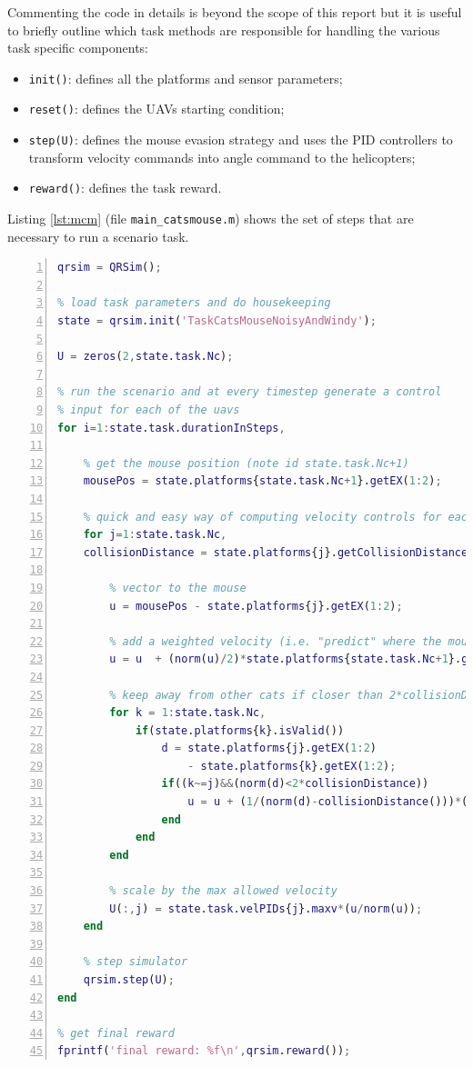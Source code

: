 \documentclass[a4paper,11pt]{report}
\newcommand\mytexttt[1]{\texttt{\hyphenchar\font=45\relax #1}}
\begin{document}
Commenting the code in details is beyond the scope of this report but it is useful to briefly outline which task methods are responsible for handling the various task specific components:
\begin{itemize}
\item\mytexttt{init()}: defines all the platforms and sensor parameters;
\item\mytexttt{reset()}: defines the UAVs starting condition;
\item\mytexttt{step(U)}: defines the mouse evasion strategy and uses the PID controllers to transform velocity commands into angle command to the helicopters;
\item\mytexttt{reward()}: defines the task reward.
\end{itemize}

Listing \ref{lst:mcm} (file \texttt{main\_catsmouse.m}) shows the set of steps that are necessary to run a scenario task.
\begin{lstlisting}[float=ht!bp,caption=main\_catsmouse.m,language=Matlab,frame=lines,label=lst:mcm,numbers=left,basicstyle=\small]
qrsim = QRSim();

% load task parameters and do housekeeping
state = qrsim.init('TaskCatsMouseNoisyAndWindy');

U = zeros(2,state.task.Nc);

% run the scenario and at every timestep generate a control
% input for each of the uavs
for i=1:state.task.durationInSteps,
    
    % get the mouse position (note id state.task.Nc+1)
    mousePos = state.platforms{state.task.Nc+1}.getEX(1:2);
    
    % quick and easy way of computing velocity controls for each cat 
    for j=1:state.task.Nc,
	collisionDistance = state.platforms{j}.getCollisionDistance();
		
        % vector to the mouse
        u = mousePos - state.platforms{j}.getEX(1:2);
        
        % add a weighted velocity (i.e. "predict" where the mouse will be)
        u = u  + (norm(u)/2)*state.platforms{state.task.Nc+1}.getEX(18:19);
        
        % keep away from other cats if closer than 2*collisionDistance        
        for k = 1:state.task.Nc,
            if(state.platforms{k}.isValid())                  
                d = state.platforms{j}.getEX(1:2) 
                    - state.platforms{k}.getEX(1:2);
                if((k~=j)&&(norm(d)<2*collisionDistance))
                    u = u + (1/(norm(d)-collisionDistance()))*(d/norm(d));
                end
            end
        end
        
        % scale by the max allowed velocity
        U(:,j) = state.task.velPIDs{j}.maxv*(u/norm(u));
    end
    
    % step simulator
    qrsim.step(U);
end

% get final reward
fprintf('final reward: %f\n',qrsim.reward());

\end{lstlisting}
\end{document}
